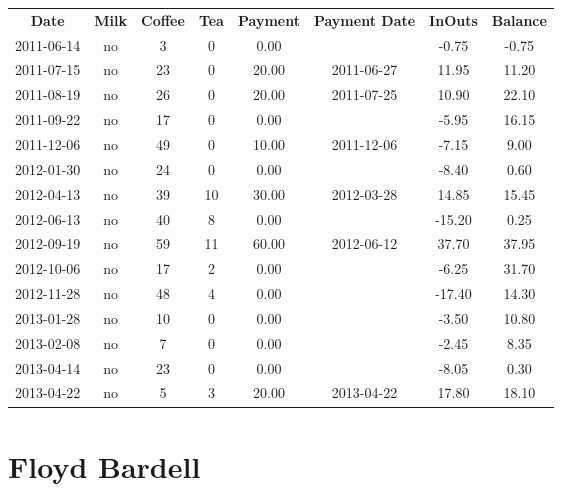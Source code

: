 \begin{center}
\begin{tabular}{cccccccc}
\textbf{Date} & \textbf{Milk} & \textbf{Coffee} & \textbf{Tea} & \textbf{Payment} & \textbf{Payment Date} & \textbf{InOuts} & \textbf{Balance} \\
2011-06-14 & no &  3 &  0 &  0.00 &  &  -0.75 & -0.75\\ 
2011-07-15 & no & 23 &  0 & 20.00 & 2011-06-27 &  11.95 & 11.20\\ 
2011-08-19 & no & 26 &  0 & 20.00 & 2011-07-25 &  10.90 & 22.10\\ 
2011-09-22 & no & 17 &  0 &  0.00 &  &  -5.95 & 16.15\\ 
2011-12-06 & no & 49 &  0 & 10.00 & 2011-12-06 &  -7.15 &  9.00\\ 
2012-01-30 & no & 24 &  0 &  0.00 &  &  -8.40 &  0.60\\ 
2012-04-13 & no & 39 & 10 & 30.00 & 2012-03-28 &  14.85 & 15.45\\ 
2012-06-13 & no & 40 &  8 &  0.00 &  & -15.20 &  0.25\\ 
2012-09-19 & no & 59 & 11 & 60.00 & 2012-06-12 &  37.70 & 37.95\\ 
2012-10-06 & no & 17 &  2 &  0.00 &  &  -6.25 & 31.70\\ 
2012-11-28 & no & 48 &  4 &  0.00 &  & -17.40 & 14.30\\ 
2013-01-28 & no & 10 &  0 &  0.00 &  &  -3.50 & 10.80\\ 
2013-02-08 & no &  7 &  0 &  0.00 &  &  -2.45 &  8.35\\ 
2013-04-14 & no & 23 &  0 &  0.00 &  &  -8.05 &  0.30\\ 
2013-04-22 & no &  5 &  3 & 20.00 & 2013-04-22 &  17.80 & 18.10
\end{tabular}
\end{center}

\section{Floyd Bardell}

